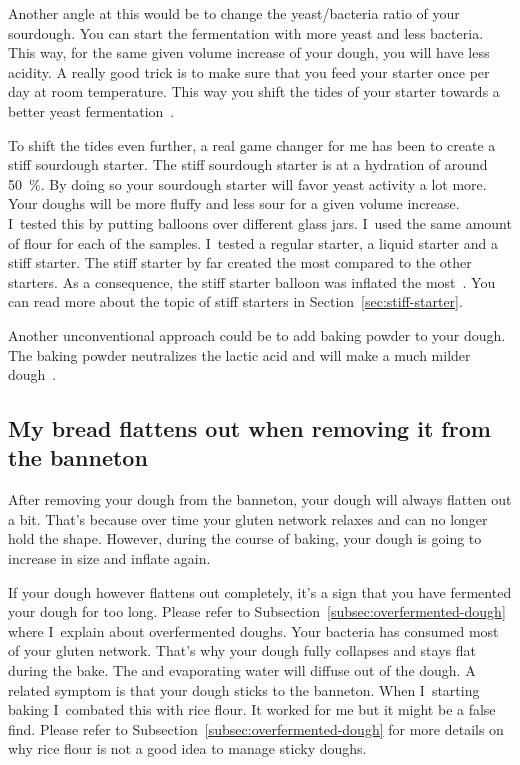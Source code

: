 Another angle at this would be to change the yeast/bacteria
ratio of your sourdough. You can start the fermentation with
more yeast and less bacteria. This way, for the same given
volume increase of your dough, you will have less acidity.
A really good trick is to make sure that you feed your starter
once per day at room temperature. This way you shift
the tides of your starter towards a better yeast fermentation~\cite*{more+active+starter}.

To shift the tides even further, a real game changer
for me has been to create a stiff sourdough starter. The
stiff sourdough starter is at a hydration of around \qty{50}{\percent}.
By doing so your sourdough starter will favor yeast
activity a lot more. Your doughs will be more fluffy and less
sour for a given volume increase. I~tested this
by putting balloons over different glass jars. I~used
the same amount of flour for each of the samples.
I~tested a regular starter, a liquid starter and a stiff
starter. The stiff starter by far created the most 
compared to the other starters. As a consequence, the stiff
starter balloon was inflated the most~\cite{stiff+starter}. You can read more
about the topic of stiff starters in Section~\ref{sec:stiff-starter}.

Another unconventional approach could be to add baking
powder to your dough. The baking powder neutralizes the
lactic acid and will make a much milder
dough~\cite{baking+powder+reduce-acidity}.

\subsection{My bread flattens out when removing it from the banneton}

After removing your dough from the banneton, your dough will always
flatten out a bit. That's because over time your gluten network
relaxes and can no longer hold the shape. However, during the course
of baking, your dough is going to increase in size and inflate again.

If your dough however flattens out completely, it's a sign that
you have fermented your dough for too long. Please refer to
Subsection~\ref{subsec:overfermented-dough}
where I~explain about overfermented doughs. Your bacteria
has consumed most of your gluten network. That's why your
dough fully collapses and stays flat during the bake. The
 and evaporating water will diffuse out of the dough.
A related symptom is that your dough sticks to the banneton.
When I~starting baking I~combated this with rice flour.
It worked for me but it might be a false find. Please refer to
Subsection~\ref{subsec:overfermented-dough} for more details on why
rice flour is not a good idea to manage sticky doughs.

